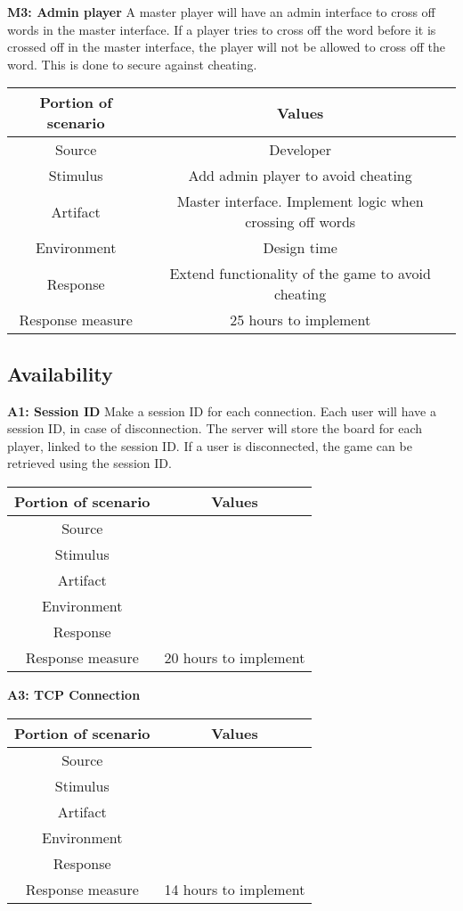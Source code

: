 {\bf M3: Admin player}
A master player will have an admin interface to cross off words in the master interface. If a player tries to cross off the word before it is crossed off in the master interface, the player will not be allowed to cross off the word. This is done to secure against cheating.

\begin{tabular}{|c|c|}
\hline
{\bf Portion of scenario} & {\bf Values} \\ \hline
Source & Developer \\ \hline
Stimulus & Add admin player to avoid cheating \\ \hline
Artifact & Master interface. Implement logic when crossing off words \\ \hline
Environment & Design time \\ \hline
Response & Extend functionality of the game to avoid cheating \\ \hline
Response measure & 25 hours to implement \\ \hline
\end{tabular}



\subsection{Availability}

{\bf A1: Session ID}
Make a session ID for each connection. Each user will have a session ID, in case of disconnection. The server will store the board for each player, linked to the session ID. If a user is disconnected, the game can be retrieved using the session ID.

\begin{tabular}{|c|c|}
\hline
{\bf Portion of scenario} & {\bf Values} \\ \hline
Source &  \\ \hline
Stimulus &  \\ \hline
Artifact &  \\ \hline
Environment &  \\ \hline
Response &  \\ \hline
Response measure & 20 hours to implement \\ \hline
\end{tabular}


{\bf A3: TCP Connection}
\begin{tabular}{|c|c|}
\hline
{\bf Portion of scenario} & {\bf Values} \\ \hline
Source &  \\ \hline
Stimulus &  \\ \hline
Artifact &  \\ \hline
Environment &  \\ \hline
Response &  \\ \hline
Response measure & 14 hours to implement \\ \hline
\end{tabular}

